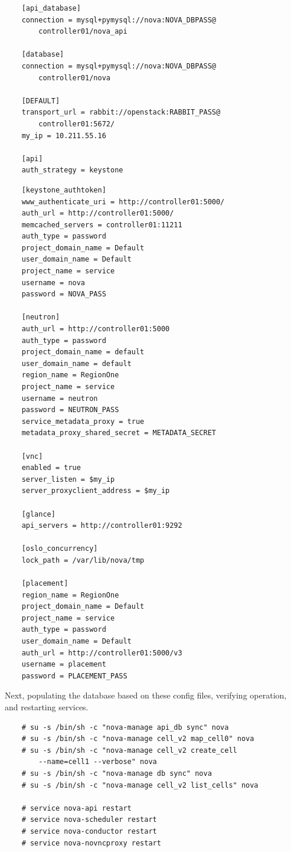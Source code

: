 \documentclass{article}
\begin{document}
\begin{verbatim}
    [api_database]
    connection = mysql+pymysql://nova:NOVA_DBPASS@
        controller01/nova_api

    [database]
    connection = mysql+pymysql://nova:NOVA_DBPASS@
        controller01/nova
    
    [DEFAULT]
    transport_url = rabbit://openstack:RABBIT_PASS@
        controller01:5672/
    my_ip = 10.211.55.16

    [api]
    auth_strategy = keystone
\end{verbatim}

\begin{verbatim}
    [keystone_authtoken]
    www_authenticate_uri = http://controller01:5000/
    auth_url = http://controller01:5000/
    memcached_servers = controller01:11211
    auth_type = password
    project_domain_name = Default
    user_domain_name = Default
    project_name = service
    username = nova
    password = NOVA_PASS

    [neutron]
    auth_url = http://controller01:5000
    auth_type = password
    project_domain_name = default
    user_domain_name = default
    region_name = RegionOne
    project_name = service
    username = neutron
    password = NEUTRON_PASS
    service_metadata_proxy = true
    metadata_proxy_shared_secret = METADATA_SECRET

    [vnc]
    enabled = true
    server_listen = $my_ip
    server_proxyclient_address = $my_ip

    [glance]
    api_servers = http://controller01:9292

    [oslo_concurrency]
    lock_path = /var/lib/nova/tmp

    [placement]
    region_name = RegionOne
    project_domain_name = Default
    project_name = service
    auth_type = password
    user_domain_name = Default
    auth_url = http://controller01:5000/v3
    username = placement
    password = PLACEMENT_PASS
\end{verbatim}

Next, populating the database based on these config files, verifying operation, and restarting services.

\begin{verbatim}
    # su -s /bin/sh -c "nova-manage api_db sync" nova
    # su -s /bin/sh -c "nova-manage cell_v2 map_cell0" nova
    # su -s /bin/sh -c "nova-manage cell_v2 create_cell 
        --name=cell1 --verbose" nova
    # su -s /bin/sh -c "nova-manage db sync" nova
    # su -s /bin/sh -c "nova-manage cell_v2 list_cells" nova

    # service nova-api restart
    # service nova-scheduler restart
    # service nova-conductor restart
    # service nova-novncproxy restart
\end{verbatim}
\end{document}

